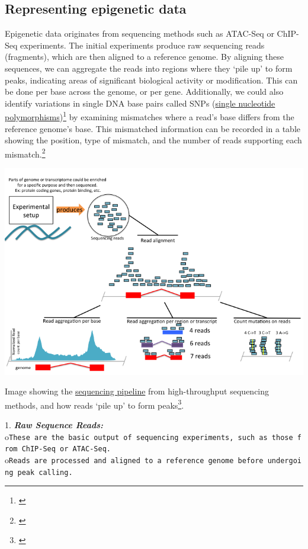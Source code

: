 \documentclass[
]{book}
\begin{document}
\subsection{Representing epigenetic data}\label{representing-epigenetic-data}

Epigenetic data originates from sequencing methods such as ATAC-Seq or ChIP-Seq experiments. The initial experiments produce raw sequencing reads (fragments), which are then aligned to a reference genome. By aligning these sequences, we can aggregate the reads into regions where they `pile up' to form peaks, indicating areas of significant biological activity or modification. This can be done per base across the genome, or per gene. Additionally, we could also identify variations in single DNA base pairs called SNPs (\href{https://www.cancer.gov/publications/dictionaries/genetics-dictionary/def/single-nucleotide-polymorphism}{single nucleotide polymorphisms})\footnote{\citet{ncidefinitions}} by examining mismatches where a read's base differs from the reference genome's base. This mismatched information can be recorded in a table showing the position, type of mismatch, and the number of reads supporting each mismatch.\footnote{\citet{akalin2020}}

\includegraphics{images/sequencing_pipeline.png}

Image showing the \href{https://compgenomr.github.io/book/images/HTseq.png}{sequencing pipeline} from high-throughput sequencing methods, and how reads `pile up' to form peaks\footnote{\citet{akalin2020}}.

1. \textbf{\emph{Raw Sequence Reads:}}
o\texttt{These\ are\ the\ basic\ output\ of\ sequencing\ experiments,\ such\ as\ those\ from\ ChIP-Seq\ or\ ATAC-Seq.}
o\texttt{Reads\ are\ processed\ and\ aligned\ to\ a\ reference\ genome\ before\ undergoing\ peak\ calling.}
\end{document}
